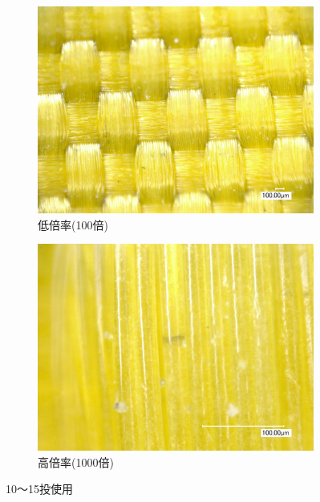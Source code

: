\documentclass[main]{subfiles}
\begin{document}
\begin{figure}[H]
    \centering
    \begin{subfigure}[htbp]{0.45\linewidth}
        \centering
        \includegraphics[keepaspectratio, width=0.8\linewidth]{figures/中心/カーリングパッド10-15低倍率.jpg}
        \caption{低倍率(100倍)}
        \label{fig:label}
    \end{subfigure}
    \begin{subfigure}[htbp]{0.45\linewidth}
        \centering
        \includegraphics[keepaspectratio, width=0.8\linewidth]{figures/中心/カーリングパッド10-15.jpg}
        \caption{高倍率(1000倍)}
        \label{fig:label}
    \end{subfigure}
    \caption{10～15投使用}
    \label{fig:6}
\end{figure}
\end{document}
